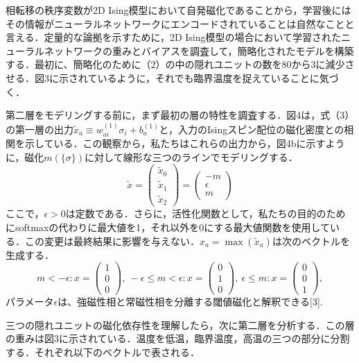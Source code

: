 \documentclass[a4paper,11pt]{jsarticle}
\begin{document}
相転移の秩序変数が2D Ising模型において自発磁化であることから，学習後にはその情報がニューラルネットワークにエンコードされていることは自然なことと言える．定量的な論拠を示すために，2D Ising模型の場合において学習されたニューラルネットワークの重みとバイアスを調査して，簡略化されたモデルを構築する．最初に、簡略化のために（2）の中の隠れユニットの数を80から3に減少させる．図3に示されているように，それでも臨界温度を捉えていることに気づく．\par
第二層をモデリングする前に，まず最初の層の特性を調査する．図4は，式（3）の第一層の出力$\tilde{x}_a \equiv w_{ai}^{(1)}\sigma_i + b_a^{(1)}$と，入力のIsingスピン配位の磁化密度との相関を示している．この観察から，私たちはこれらの出力から，図4bに示すように，磁化$m(\{ \sigma \})$に対して線形な三つのラインでモデリングする．
\begin{equation}
  \tilde{x} =
  \begin{pmatrix}
    \tilde{x}_0 \\ \tilde{x}_1 \\ \tilde{x}_2
  \end{pmatrix}
  =
  \begin{pmatrix}
    -m \\ \epsilon \\ m
  \end{pmatrix}
\end{equation}
ここで，$\epsilon > 0$は定数である．さらに，活性化関数として，私たちの目的のためにsoftmaxの代わりに最大値を1，それ以外を0にする最大値関数を使用している．この変更は最終結果に影響を与えない．$x_a = \max{(\tilde{x}_a)}$は次のベクトルを生成する．
\begin{equation}
  m<-\epsilon : x=
  \begin{pmatrix}
    1 \\ 0 \\ 0
  \end{pmatrix}, \
  -\epsilon \leq m < \epsilon : x=
  \begin{pmatrix}
    0 \\ 1 \\ 0
  \end{pmatrix}, \
  \epsilon \leq m : x=
  \begin{pmatrix}
    0 \\ 0 \\ 1
  \end{pmatrix},
\end{equation}
パラメータ$\epsilon$は、強磁性相と常磁性相を分離する閾値磁化と解釈できる[3].\par
三つの隠れユニットの磁化依存性を理解したら，次に第二層を分析する．この層の重みは図3に示されている．温度を低温，臨界温度，高温の三つの部分に分割する．それぞれ以下のベクトルで表される．
\end{document}
